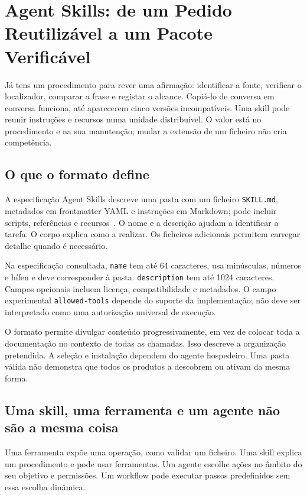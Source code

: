 \chapter{Agent Skills: de um Pedido Reutilizável a um Pacote Verificável}
\label{ch:skills}

Já tens um procedimento para rever uma afirmação: identificar a fonte, verificar o localizador, comparar a frase e registar o alcance. Copiá-lo de conversa em conversa funciona, até aparecerem cinco versões incompatíveis. Uma skill pode reunir instruções e recursos numa unidade distribuível. O valor está no procedimento e na sua manutenção; mudar a extensão de um ficheiro não cria competência.

\section{O que o formato define}
A especificação Agent Skills descreve uma pasta com um ficheiro \texttt{SKILL.md}, metadados em frontmatter YAML e instruções em Markdown; pode incluir scripts, referências e recursos~\citep{agentskills2026}. O nome e a descrição ajudam a identificar a tarefa. O corpo explica como a realizar. Os ficheiros adicionais permitem carregar detalhe quando é necessário.

Na especificação consultada, \texttt{name} tem até 64 caracteres, usa minúsculas, números e hífen e deve corresponder à pasta. \texttt{description} tem até 1024 caracteres. Campos opcionais incluem licença, compatibilidade e metadados. O campo experimental \texttt{allowed-tools} depende do suporte da implementação; não deve ser interpretado como uma autorização universal de execução.

O formato permite divulgar conteúdo progressivamente, em vez de colocar toda a documentação no contexto de todas as chamadas. Isso descreve a organização pretendida. A seleção e instalação dependem do agente hospedeiro. Uma pasta válida não demonstra que todos os produtos a descobrem ou ativam da mesma forma.

\section{Uma skill, uma ferramenta e um agente não são a mesma coisa}
Uma ferramenta expõe uma operação, como validar um ficheiro. Uma skill explica um procedimento e pode usar ferramentas. Um agente escolhe ações no âmbito do seu objetivo e permissões. Um workflow pode executar passos predefinidos sem essa escolha dinâmica.

